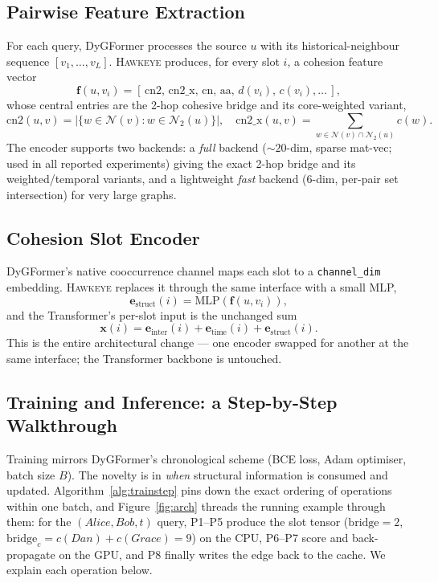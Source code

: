 \documentclass[sigconf,nonacm,review]{acmart}
\newcommand{\method}{\textsc{Hawkeye}\xspace}
\newcommand{\Ncal}{\mathcal{N}}
\begin{document}
\subsection{Pairwise Feature Extraction}
For each query, DyGFormer processes the source $u$ with its historical-neighbour
sequence $[v_1,\dots,v_L]$. \method produces, for every slot $i$, a cohesion
feature vector
\begin{equation}
\mathbf{f}(u,v_i)=[\,\mathrm{cn2},\,\mathrm{cn2\_x},\,\mathrm{cn},\,
\mathrm{aa},\,d(v_i),\,c(v_i),\dots\,],
\end{equation}
whose central entries are the 2-hop cohesive bridge and its core-weighted
variant,
\begin{equation}
\mathrm{cn2}(u,v)=|\{w\in\Ncal(v):w\in\Ncal_2(u)\}|,\quad
\mathrm{cn2\_x}(u,v)=\!\!\!\sum_{w\in\Ncal(v)\cap\Ncal_2(u)}\!\!\!c(w).
\end{equation}
The encoder supports two backends: a \emph{full} backend ($\sim 20$-dim,
sparse mat-vec; used in all reported experiments) giving the exact 2-hop bridge
and its weighted/temporal variants, and a lightweight \emph{fast} backend
(6-dim, per-pair set intersection) for very large graphs.

\subsection{Cohesion Slot Encoder}
DyGFormer's native cooccurrence channel maps each slot to a
\texttt{channel\_dim} embedding. \method replaces it through the same interface
with a small MLP,
\begin{equation}
\mathbf{e}_{\text{struct}}(i)=\mathrm{MLP}(\mathbf{f}(u,v_i)),
\end{equation}
and the Transformer's per-slot input is the unchanged sum
\begin{equation}
\mathbf{x}(i)=\mathbf{e}_{\text{inter}}(i)+\mathbf{e}_{\text{time}}(i)
+\mathbf{e}_{\text{struct}}(i).
\end{equation}
This is the entire architectural change --- one encoder swapped for another at
the same interface; the Transformer backbone is untouched.

\subsection{Training and Inference: a Step-by-Step Walkthrough}
\label{sec:training-walkthrough}
Training mirrors DyGFormer's chronological scheme (BCE loss, Adam optimiser,
batch size $B$). The novelty is in \emph{when} structural information is
consumed and updated. Algorithm~\ref{alg:trainstep} pins down the exact
ordering of operations within one batch, and
Figure~\ref{fig:arch} threads the running example through them: for the
$(\textit{Alice},\textit{Bob},t)$ query, P1--P5 produce the slot tensor
($\mathrm{bridge}=2$, $\mathrm{bridge}_c=c(\textit{Dan})+c(\textit{Grace})=9$)
on the CPU, P6--P7 score and back-propagate on the GPU, and P8 finally
writes the edge back to the cache. We explain each operation below.
\end{document}
